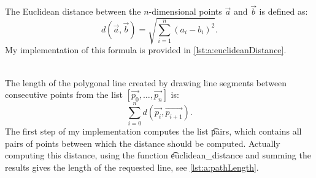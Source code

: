 The Euclidean distance between the $n$-dimensional points $\vec{a}$ and $\vec{b}$ is defined as:
	\begin{equation}
		d(\vec{a},\vec{b}) = \sqrt{\sum_{i = 1}^{n} (a_i - b_i)^2}.
	\end{equation}
My implementation of this formula is provided in \autoref{lst:a:euclideanDistance}.

~\\
The length of the polygonal line created by drawing line segments between consecutive points from the list $[\vec{p_0}, \ldots, \vec{p_n}]$ is:
	\begin{equation}
		\sum_{i=0}^{n} d(\vec{p_i}, \vec{p_{i+1}}).
	\end{equation}
The first step of my implementation computes the list \t{pairs}, which contains all pairs of points between which the distance should be computed. Actually computing this distance, using the function \t{euclidean\_distance} and summing the results gives the length of the requested line, see \autoref{lst:a:pathLength}.

